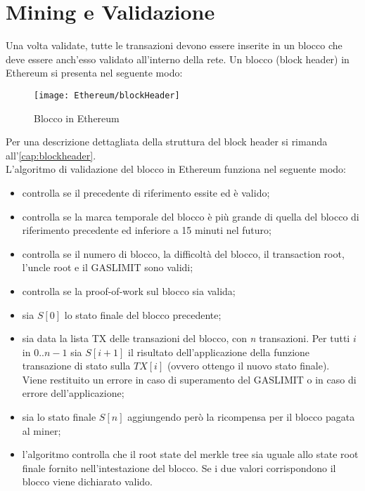 \section{Mining e Validazione}
%
Una volta validate, tutte le transazioni devono essere inserite in un blocco che deve essere anch'esso validato all'interno della rete. Un blocco (block header) in Ethereum si presenta nel seguente modo:
\begin{center}
	\begin{figure}[h!]
		\centering
		\texttt{[image: Ethereum/blockHeader]}
		\caption{Blocco in Ethereum}
		\label{fig:blocco in Ethereum}
	\end{figure}
\end{center}
Per una descrizione dettagliata della struttura del block header si rimanda all'\autoref{cap:blockheader}. \\
L'algoritmo di validazione del blocco in Ethereum funziona nel seguente modo:
\begin{itemize}
	\item controlla se il precedente di riferimento essite ed è valido;
	\item controlla se la marca temporale del blocco è più grande di quella del blocco di riferimento precedente ed inferiore a 15 minuti nel futuro;
	\item controlla se il numero di blocco, la difficoltà del blocco, il transaction root, l'uncle root e il GASLIMIT sono validi;
	\item controlla se la proof-of-work sul blocco sia valida;
	\item sia $S[0]$ lo stato finale del blocco precedente;
	\item sia data la lista TX delle transazioni del blocco, con \emph{n} transazioni. Per tutti $i$ in $0..n-1$ sia $S[i+1]$ il risultato dell'applicazione della funzione transazione di stato sulla $TX[i]$ (ovvero ottengo il nuovo stato finale).\\ Viene restituito un errore in caso di superamento del GASLIMIT o in caso di errore dell'applicazione;
	\item sia lo stato finale $S[n]$ aggiungendo però la ricompensa per il blocco pagata al miner;
	\item l'algoritmo controlla che il root state del merkle tree sia uguale allo state root finale fornito nell'intestazione del blocco. Se i due valori corrispondono il blocco viene dichiarato valido. 
\end{itemize}%
